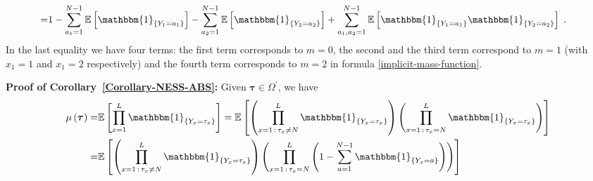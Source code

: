 \documentclass[10pt]{article}
\numberwithin{equation}{section}
\numberwithin{equation}{subsection}
\newcommand{\dt}{\;.}
\begin{document}
\begin{itemize}
\begin{align}
 		\\=&
 		1-\sum_{a_{1}=1}^{N-1}\mathbb{E}\left[\mathbbm{1}_{\{Y_{1}=a_{1}\}}\right]-\sum_{a_{2}=1}^{N-1}\mathbb{E}\left[\mathbbm{1}_{\{Y_{2}=a_{2}\}}\right]+\sum_{a_{1},a_{2}=1}^{N-1}\mathbb{E}\left[\mathbbm{1}_{\{Y_{1}=a_{1}\}}\mathbbm{1}_{\{Y_{2}=a_{2}\}}\right]\dt
 	\end{align}
 	{\color{blue}In the last equality we have four terms: the first term corresponds to $m=0$, the second and the third term correspond to $m=1$ (with $x_{1}=1$ and $x_{1}=2$ respectively) and the fourth term corresponds to $m=2$ in formula \eqref{implicit-mass-function}. }
	
 \end{itemize}
\textbf{Proof of Corollary~\ref{Corollary-NESS-ABS}:}
Given $\bm{\tau}\in \Omega^{'}$,  we have 
\begin{align}
	\mu\left(\bm{\tau}\right)=&\mathbb{E}\left[\prod_{x=1}^{L}\mathbbm{1}_{\{Y_{x}=\tau_{x}\}}\right]
	=\mathbb{E}\left[\left(\prod_{x=1\,:\,\tau_{x}\neq N}^{L}\mathbbm{1}_{\{Y_{x}=\tau_{x}\}}\right)\left(\prod_{x=1\,:\,\tau_{x}=N}^{L}\mathbbm{1}_{\{Y_{x}=\tau_x\}}\right)\right]\nonumber\\
	=&\mathbb{E}\left[\left(\prod_{x=1\,:\,\tau_{x}\neq N}^{L}\mathbbm{1}_{\{Y_{x}=\tau_{x}\}}\right)\left(\prod_{x=1\,:\,\tau_{x}=N}^{L}\left(1-\sum_{a=1}^{N-1}\mathbbm{1}_{\{Y_{x}=a\}}\right)\right)\right]
\end{align}
\end{document}
